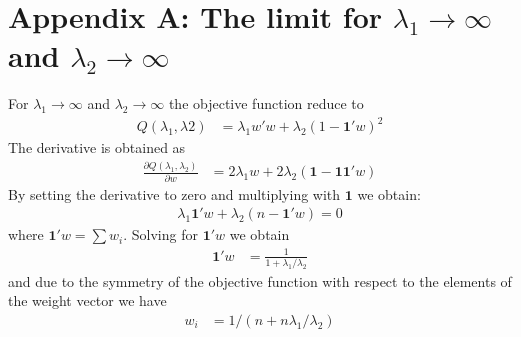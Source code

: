 \documentclass[12pt,a4paper]{article}
\begin{document}
\section{Appendix A: The limit for $\lambda_1\to \infty$ and $\lambda_2 \to \infty$}
%
For $\lambda_1\to \infty$ and $\lambda_2\to \infty$ the objective function reduce to
\begin{align*}
Q(\lambda_1,\lambda2) &= \lambda_1 w'w + \lambda_2 (1-\mathbf{1}'w)^2
\end{align*}
The derivative is obtained as
\begin{align*}
\frac{ \partial Q(\lambda_1,\lambda_2) }{ \partial w} &= 2 \lambda_1 w + 2 \lambda_2 (\mathbf{1}-\mathbf{1} \mathbf{1}'w)
\end{align*}
By setting the derivative to zero and multiplying with $\mathbf{1}$ we obtain:
\begin{align*}
\lambda_1 \mathbf{1}'w + \lambda_2 (n- \mathbf{1}'w) = 0
\end{align*}
where $\mathbf{1}'w =\sum w_i$. Solving for $ \mathbf{1}'w $ we obtain
\begin{align*}
\mathbf{1}'w  &= \frac{ 1}{ 1 +\lambda_1/\lambda_2 }
\end{align*}
and due to the symmetry of the objective function with respect to the elements of the weight vector we have
\begin{align*}
w_i &= 1/(n+n\lambda_1/\lambda_2)
\end{align*}
\end{document}
